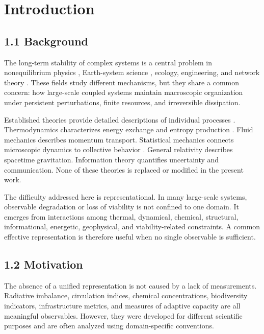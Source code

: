 ﻿\section{Introduction}


\subsection{1.1 Background}

The long-term stability of complex systems is a central problem in nonequilibrium physics \cite{NicolisPrigogine1977,Haken1977Synergetics}, Earth-system science \cite{Rockstrom2009,Steffen2015,Richardson2023}, ecology, engineering, and network theory \cite{Mitchell2009,Barabasi2016}. These fields study different mechanisms, but they share a common concern: how large-scale coupled systems maintain macroscopic organization under persistent perturbations, finite resources, and irreversible dissipation.

Established theories provide detailed descriptions of individual processes \cite{NicolisPrigogine1977,Jaynes1957I,Wilson1983RG,Goldenfeld1992}. Thermodynamics characterizes energy exchange and entropy production \cite{NicolisPrigogine1977,Jaynes1957I}. Fluid mechanics describes momentum transport. Statistical mechanics connects microscopic dynamics to collective behavior \cite{Jaynes1957I}. General relativity describes spacetime gravitation. Information theory quantifies uncertainty and communication. None of these theories is replaced or modified in the present work.

The difficulty addressed here is representational. In many large-scale systems, observable degradation or loss of viability is not confined to one domain. It emerges from interactions among thermal, dynamical, chemical, structural, informational, energetic, geophysical, and viability-related constraints. A common effective representation is therefore useful when no single observable is sufficient.

\subsection{1.2 Motivation}

The absence of a unified representation is not caused by a lack of measurements. Radiative imbalance, circulation indices, chemical concentrations, biodiversity indicators, infrastructure metrics, and measures of adaptive capacity are all meaningful observables. However, they were developed for different scientific purposes and are often analyzed using domain-specific conventions.

